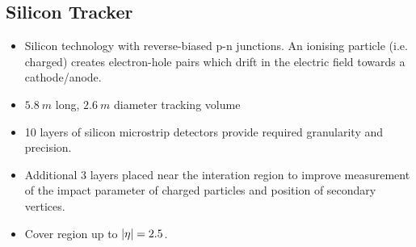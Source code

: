     \subsection{Silicon Tracker}

    \begin{itemize}
        \item Silicon technology with reverse-biased p-n junctions. An ionising
            particle (i.e. charged) creates electron-hole pairs which drift in the
            electric field towards a cathode/anode.
        \item ${\SI{5.8}{m}}$ long, ${\SI{2.6}{m}}$ diameter tracking volume
        \item 10 layers of silicon microstrip detectors provide required granularity
        and precision.
    \item Additional 3 layers placed near the interation region to improve
        measurement of the impact parameter of charged particles and position
        of secondary vertices.
    \item Cover region up to ${|\eta|=2.5}$.
\end{itemize}

\subsection{\ECAL}


